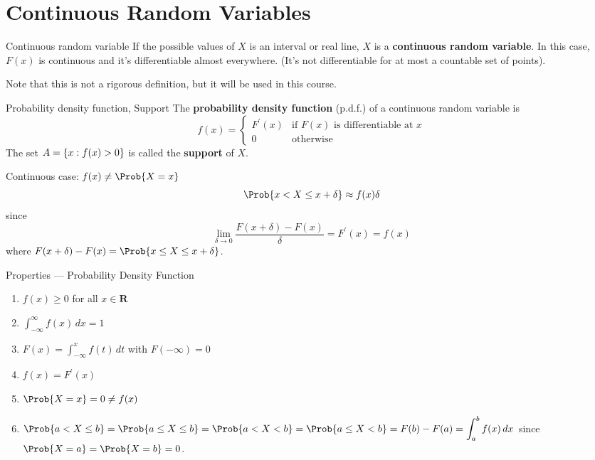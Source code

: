 \section{Continuous Random Variables}
\begin{Definition}{Continuous random variable}{}
    If the possible values of $ X $ is an interval or real line,
    $ X $ is a \textbf{continuous random variable}. In this case,
    $ F(x) $ is continuous and it's differentiable
    almost everywhere. (It's not differentiable for at
    most a countable set of points).
\end{Definition}
Note that this is not a rigorous definition, but it will be
used in this course.

\begin{Definition}{Probability density function, Support}{}
    The \textbf{probability density function} (p.d.f.) of a continuous random variable
    is
    \[ f(x)=\begin{cases}
            F^\prime(x) & \text{if }F(x)\text{ is differentiable at }x \\
            0           & \text{otherwise}
        \end{cases} \]
    The set $ A=\{x:f(x)>0\} $ is called the \textbf{support}
    of $ X $.
\end{Definition}

Continuous case: $ f(x)\neq \Prob{X=x} $
\[ \Prob{x<X\le x+\delta}\approx f(x)\delta \]
since
\[ \lim\limits_{{\delta} \to {0}}\frac{F(x+\delta)-F(x)}{\delta}=F^\prime(x)=f(x) \]
where $ F(x+\delta)-F(x)=\Prob{x\le X\le x+\delta} $.
\begin{Definition}{Properties --- Probability Density Function}{}
    \begin{enumerate}[label=(\Roman*)]
        \item $ f(x)\ge 0 $ for all $ x\in\mathbf{R} $
        \item $ \displaystyle \int_{-\infty}^{\infty} f(x)\, d{x}= 1 $
        \item $ \displaystyle F(x)=\int_{-\infty}^{x} f(t)\, d{t} $
              with $ F(-\infty)=0 $
        \item $ f(x)=F^\prime(x) $
        \item $ \Prob{X=x}=0\ne f(x) $
        \item $ \displaystyle
                  \Prob{a<X\le b}=\Prob{a\le X\le b}=\Prob{a<X<b}=\Prob{a\le X <b}=
                  F(b)-F(a)=\int_{a}^{b} f(x)\, d{x} $
              since $ \Prob{X=a}=\Prob{X=b}=0 $.
    \end{enumerate}
\end{Definition}

